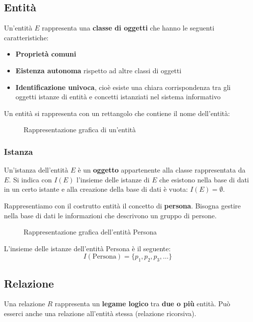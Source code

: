 \documentclass[a4paper]{article}
\begin{document}
\subsection{Entità}
Un'entità \( E \) rappresenta una \textbf{classe di oggetti} che hanno le seguenti
caratteristiche:
\begin{itemize}
  \item \textbf{Proprietà comuni}
  \item \textbf{Eistenza autonoma} rispetto ad altre classi di oggetti
  \item \textbf{Identificazione univoca}, cioè esiste una chiara corrispondenza tra
    gli oggetti istanze di entità e concetti istanziati nel sistema informativo
\end{itemize}
Un entità si rappresenta con un rettangolo che contiene il nome dell'entità:
\begin{figure}[H]
  \centering
  \caption{Rappresentazione grafica di un'entità}
\end{figure}

\subsubsection{Istanza}
Un'istanza dell'entità \( E \) è un \textbf{oggetto} appartenente alla classe rappresentata
da \( E \). Si indica con \( I(E) \) l'insieme delle istanze di \( E \) che esistono
nella base di dati in un certo istante e alla creazione della base di dati è vuota:
\( I(E) = \emptyset \).

\ex{}
{
  Rappresentiamo con il costrutto entità il concetto di \textbf{persona}. Bisogna gestire
  nella base di dati le informazioni che descrivono un gruppo di persone.
  \begin{figure}[H]
    \centering
    \caption{Rappresentazione grafica dell'entità Persona}
  \end{figure}
  L'insieme delle istanze dell'entità Persona è il seguente:
  \[
    I(\text{Persona}) = \{p_1, p_2, p_3, \ldots\}
  \]
}

\subsection{Relazione}
Una relazione \( R \) rappresenta un \textbf{legame logico} tra \textbf{due o più} entità.
Può esserci anche una relazione all'entità stessa (relazione ricorsiva).
\end{document}
